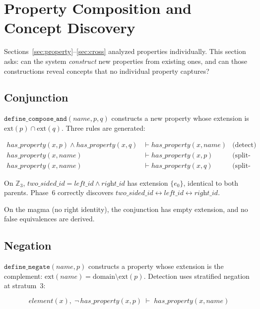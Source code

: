 \section{Property Composition and Concept Discovery}
\label{sec:composition}

Sections~\ref{sec:property}--\ref{sec:cross} analyzed properties individually. This section asks: can the system \emph{construct} new properties from existing ones, and can those constructions reveal concepts that no individual property captures?

\subsection{Conjunction}

$\texttt{define\_compose\_and}(\textit{name}, p, q)$ constructs a new property whose extension is $\mathrm{ext}(p) \cap \mathrm{ext}(q)$. Three rules are generated:

\begin{align*}
\mathit{has\_property}(x, p) \wedge \mathit{has\_property}(x, q) &\vdash \mathit{has\_property}(x, \textit{name}) & \text{(detect)} \\
\mathit{has\_property}(x, \textit{name}) &\vdash \mathit{has\_property}(x, p) & \text{(split-left)} \\
\mathit{has\_property}(x, \textit{name}) &\vdash \mathit{has\_property}(x, q) & \text{(split-right)}
\end{align*}

On $\mathbb{Z}_3$, $\textit{two\_sided\_id} = \textit{left\_id} \wedge \textit{right\_id}$ has extension $\{e_0\}$, identical to both parents. Phase~6 correctly discovers $\textit{two\_sided\_id} \leftrightarrow \textit{left\_id} \leftrightarrow \textit{right\_id}$.

On the magma (no right identity), the conjunction has empty extension, and no false equivalences are derived.

\subsection{Negation}

$\texttt{define\_negate}(\textit{name}, p)$ constructs a property whose extension is the complement: $\mathrm{ext}(\textit{name}) = \mathrm{domain} \setminus \mathrm{ext}(p)$. Detection uses stratified negation at stratum~3:

\[
\mathit{element}(x),\; \lnot\, \mathit{has\_property}(x, p) \;\vdash\; \mathit{has\_property}(x, \textit{name})
\]


